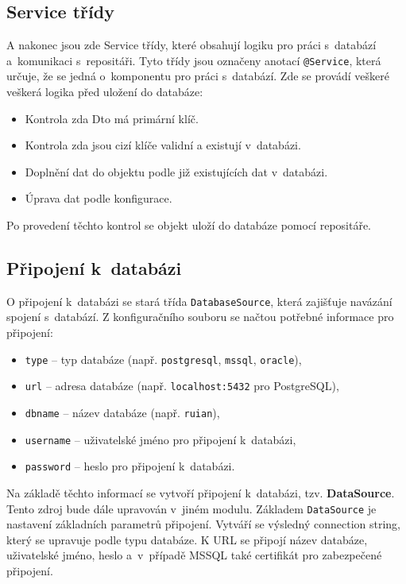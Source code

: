 \subsection{Service třídy}
\label{sec:serviceTridy}
A nakonec jsou zde Service třídy, které obsahují logiku pro práci s~databází a~komunikaci s~repositáři.
Tyto třídy jsou označeny anotací \texttt{@Service}, která určuje, že se jedná o~komponentu pro práci s~databází.
Zde se provádí veškeré veškerá logika před uložení do databáze:

\newpage

\begin{itemize}
    \item Kontrola zda Dto má primární klíč.
    \item Kontrola zda jsou cizí klíče validní a existují v~databázi.
    \item Doplnění dat do objektu podle již existujících dat v~databázi.
    \item Úprava dat podle konfigurace.
\end{itemize}
Po provedení těchto kontrol se objekt uloží do databáze pomocí repositáře. 

\subsection{Připojení k~databázi}
O připojení k~databázi se stará třída \texttt{DatabaseSource}, která zajišťuje navázání spojení s~databází.  
Z konfiguračního souboru se načtou potřebné informace pro připojení:
\begin{itemize}
    \item \texttt{type} -- typ databáze (např. \texttt{postgresql}, \texttt{mssql}, \texttt{oracle}),
    \item \texttt{url} -- adresa databáze (např. \texttt{localhost:5432} pro PostgreSQL),
    \item \texttt{dbname} -- název databáze (např. \texttt{ruian}),
    \item \texttt{username} -- uživatelské jméno pro připojení k~databázi,
    \item \texttt{password} -- heslo pro připojení k~databázi.
\end{itemize}

Na základě těchto informací se vytvoří připojení k~databázi, tzv. \textbf{DataSource}.
Tento zdroj bude dále upravován v~jiném modulu.  
Základem \texttt{DataSource} je nastavení základních parametrů připojení.  
Vytváří se výsledný connection string, který se upravuje podle typu databáze.  
K URL se připojí název databáze, uživatelské jméno, heslo a~v~případě MSSQL také certifikát pro zabezpečené připojení.

